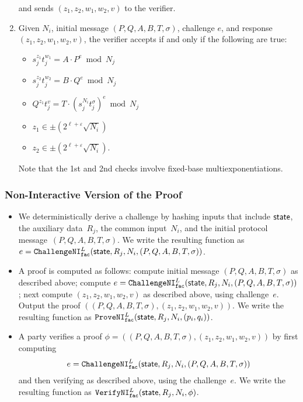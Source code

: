 \documentclass[11pt]{article}
\def\state{{\sf state}}
\newcommand{\challengeni}[1]{\ensuremath{\mathtt{ChallengeNI}_{\mathtt{#1}}}}
\newcommand{\proveni}[1]{\ensuremath{\mathtt{ProveNI}_{\mathtt{#1}}}}
\newcommand{\verifyni}[1]{\ensuremath{\mathtt{VerifyNI}_{\mathtt{#1}}}}
\newcommand{\?}[1]{\stackrel{?}{#1}}
\begin{document}
\begin{enumerate}
    and sends $(z_1, z_2, w_1, w_2, v)$ to the verifier.

  \item Given $N_i$, initial message $(P, Q, A, B, T, \sigma)$, challenge $e$, and response $(z_1, z_2, w_1, w_2, v)$, the verifier accepts if and only if the following are true: \begin{itemize}
\item    $s_j^{z_1} t_j^{w_1} = A \cdot P^e \bmod N_j$ 
\item    $s_j^{z_2} t_j^{w_2} = B \cdot Q^e \bmod N_j$ 
\item    $Q^{z_1} t_j^{v} = T \cdot (s_j^{N_i} t_j^\sigma)^e \bmod N_j$ 
\item    $z_1 \in \pm \left(2^{\ell + \varepsilon} \sqrt{N_i}\right)$ 
\item    $z_2 \in \pm \left(2^{\ell + \varepsilon} \sqrt{N_i}\right)$.
\end{itemize}
Note that the 1st and 2nd checks involve fixed-base multiexponentiations.

\end{enumerate}

\subsubsection{Non-Interactive Version of the Proof}

\begin{itemize}
  \item We deterministically derive a challenge by hashing inputs that include $\state$, the auxiliary data~$R_j$, the common input~$N_i$, and the initial protocol message~$(P, Q, A, B, T, \sigma)$.
  We write the resulting function as
  $e=\challengeni{fac}^{L} (\state, R_j, N_i, (P, Q, A, B, T, \sigma))$.

 

  \item A proof is computed as follows:  compute initial message $(P, Q, A, B, T, \sigma)$ as described above; compute $e=\challengeni{fac}^{L} (\state, R_j, N_i, (P, Q, A, B, T, \sigma))$; next compute $(z_1, z_2, w_1, w_2, v)$ as described above, using challenge~$e$. Output the proof $((P, Q, A, B, T, \sigma), (z_1, z_2, w_1, w_2, v))$. We write the resulting function as $\proveni{fac}^{L}(\state, R_j, N_i, (p_i, q_i))$.

  \item A party verifies a proof $\phi=((P, Q, A, B, T, \sigma), (z_1, z_2, w_1, w_2, v))$ by first computing \[e=\challengeni{fac}^{L} (\state, R_j, N_i, (P, Q, A, B, T, \sigma))\] and then verifying as described above, using the challenge~$e$. We write the resulting function as $\verifyni{fac}^{L}(\state, R_j, N_i, \phi)$.
\end{itemize}
\end{document}
